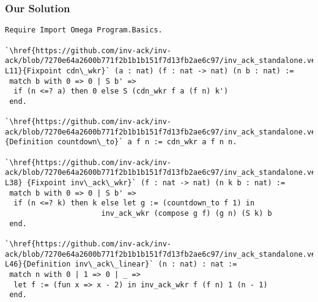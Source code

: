 \begin{frame}[fragile]
\frametitle{Our Solution}

\vspace{-1em}
\lstset{style=myTinyStyle}
\begin{mdframed}[backgroundcolor=lightgray, roundcorner=10pt,leftmargin=0, rightmargin=0, innerleftmargin=0, innertopmargin=-5,innerbottommargin=-5, outerlinewidth=0, linecolor=lightgray]
\begin{lstlisting}
Require Import Omega Program.Basics.

`\href{https://github.com/inv-ack/inv-ack/blob/7270e64a2600b771f2b1b1b151f7d13fb2ae6c97/inv_ack_standalone.v#L6-L11}{Fixpoint cdn\_wkr}` (a : nat) (f : nat -> nat) (n b : nat) :=
 match b with 0 => 0 | S b' =>
  if (n <=? a) then 0 else S (cdn_wkr f a (f n) k')
 end.

`\href{https://github.com/inv-ack/inv-ack/blob/7270e64a2600b771f2b1b1b151f7d13fb2ae6c97/inv_ack_standalone.v#L14}{Definition countdown\_to}` a f n := cdn_wkr a f n n.

`\href{https://github.com/inv-ack/inv-ack/blob/7270e64a2600b771f2b1b1b151f7d13fb2ae6c97/inv_ack_standalone.v#L32-L38} {Fixpoint inv\_ack\_wkr}` (f : nat -> nat) (n k b : nat) :=
 match b with 0 => 0 | S b' =>
  if (n <=? k) then k else let g := (countdown_to f 1) in
                      inv_ack_wkr (compose g f) (g n) (S k) b
 end.

`\href{https://github.com/inv-ack/inv-ack/blob/7270e64a2600b771f2b1b1b151f7d13fb2ae6c97/inv_ack_standalone.v#L42-L46}{Definition inv\_ack\_linear}` (n : nat) : nat :=
 match n with 0 | 1 => 0 | _ => 
  let f := (fun x => x - 2) in inv_ack_wkr f (f n) 1 (n - 1)
 end.
\end{lstlisting}
\end{mdframed} 
\end{frame}


%
%
%
%
%
%
%
%


